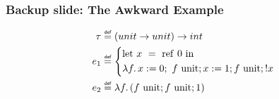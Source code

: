 \documentclass{beamer}
\newcommand{\isdef}{\mathrel{\overset{\makebox[0pt]{\mbox{\normalfont\tiny\sffamily def}}}{=}}}
\begin{document}
\appendix
\begin{frame}
  \frametitle{Backup slide: The Awkward Example}
  \begin{align*}
    \tau &\isdef (unit \rightarrow unit) \rightarrow int\\
    e_1 &\isdef
          \left\{\begin{aligned}
            &\mathrm{let}~ x~ =~ \mathrm{ref}~ 0~ \mathrm{in}~\\
          &\lambda f\ldotp x \mathrel{:=} 0;~ f~\mathrm{unit}; x \mathrel{:=} 1; f~ \mathrm{unit}; !x
          \end{aligned}\right.\\
    e_2 &\isdef \lambda f\ldotp (f~\mathrm{unit}; f~\mathrm{unit}; 1)
  \end{align*}
\end{frame}
\end{document}
